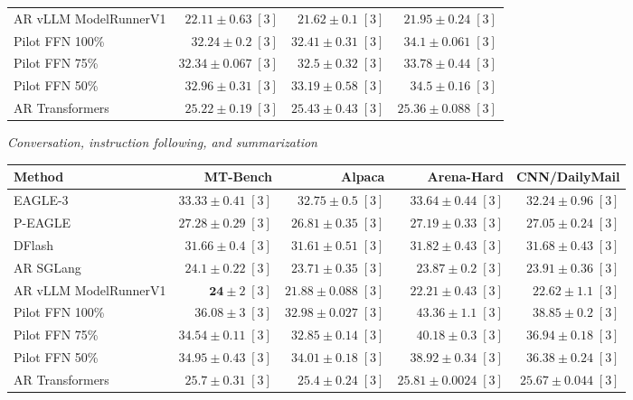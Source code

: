 \documentclass[conference,onecolumn]{IEEEtran}
\begin{document}
\begin{table}[!htp]
\begin{tabular}{@{}>{\raggedright\arraybackslash}p{3.7cm}rrr@{}}
AR \textperiodcentered{} vLLM ModelRunnerV1 & \(\mathbf{22.11} \pm 0.63\;[3]\) & \(\mathbf{21.62} \pm 0.1\;[3]\) & \(\mathbf{21.95} \pm 0.24\;[3]\) \\
Pilot FFN 100\% & \(32.24 \pm 0.2\;[3]\) & \(32.41 \pm 0.31\;[3]\) & \(34.1 \pm 0.061\;[3]\) \\
Pilot FFN 75\% & \(32.34 \pm 0.067\;[3]\) & \(32.5 \pm 0.32\;[3]\) & \(33.78 \pm 0.44\;[3]\) \\
Pilot FFN 50\% & \(32.96 \pm 0.31\;[3]\) & \(33.19 \pm 0.58\;[3]\) & \(34.5 \pm 0.16\;[3]\) \\
AR \textperiodcentered{} Transformers & \(25.22 \pm 0.19\;[3]\) & \(25.43 \pm 0.43\;[3]\) & \(25.36 \pm 0.088\;[3]\) \\
\bottomrule
\end{tabular}\par\medskip
\textit{Conversation, instruction following, and summarization}\par\smallskip
\begin{tabular}{@{}>{\raggedright\arraybackslash}p{3.7cm}rrrr@{}}
\toprule
Method & MT-Bench & Alpaca & Arena-Hard & CNN/DailyMail \\
\midrule
EAGLE-3 & \(33.33 \pm 0.41\;[3]\) & \(32.75 \pm 0.5\;[3]\) & \(33.64 \pm 0.44\;[3]\) & \(32.24 \pm 0.96\;[3]\) \\
P-EAGLE & \(27.28 \pm 0.29\;[3]\) & \(26.81 \pm 0.35\;[3]\) & \(27.19 \pm 0.33\;[3]\) & \(27.05 \pm 0.24\;[3]\) \\
DFlash & \(31.66 \pm 0.4\;[3]\) & \(31.61 \pm 0.51\;[3]\) & \(31.82 \pm 0.43\;[3]\) & \(31.68 \pm 0.43\;[3]\) \\
AR \textperiodcentered{} SGLang & \(24.1 \pm 0.22\;[3]\) & \(23.71 \pm 0.35\;[3]\) & \(23.87 \pm 0.2\;[3]\) & \(23.91 \pm 0.36\;[3]\) \\
AR \textperiodcentered{} vLLM ModelRunnerV1 & \(\mathbf{24} \pm 2\;[3]\) & \(\mathbf{21.88} \pm 0.088\;[3]\) & \(\mathbf{22.21} \pm 0.43\;[3]\) & \(\mathbf{22.62} \pm 1.1\;[3]\) \\
Pilot FFN 100\% & \(36.08 \pm 3\;[3]\) & \(32.98 \pm 0.027\;[3]\) & \(43.36 \pm 1.1\;[3]\) & \(38.85 \pm 0.2\;[3]\) \\
Pilot FFN 75\% & \(34.54 \pm 0.11\;[3]\) & \(32.85 \pm 0.14\;[3]\) & \(40.18 \pm 0.3\;[3]\) & \(36.94 \pm 0.18\;[3]\) \\
Pilot FFN 50\% & \(34.95 \pm 0.43\;[3]\) & \(34.01 \pm 0.18\;[3]\) & \(38.92 \pm 0.34\;[3]\) & \(36.38 \pm 0.24\;[3]\) \\
AR \textperiodcentered{} Transformers & \(25.7 \pm 0.31\;[3]\) & \(25.4 \pm 0.24\;[3]\) & \(25.81 \pm 0.0024\;[3]\) & \(25.67 \pm 0.044\;[3]\) \\

\end{tabular}
\end{table}
\end{document}
